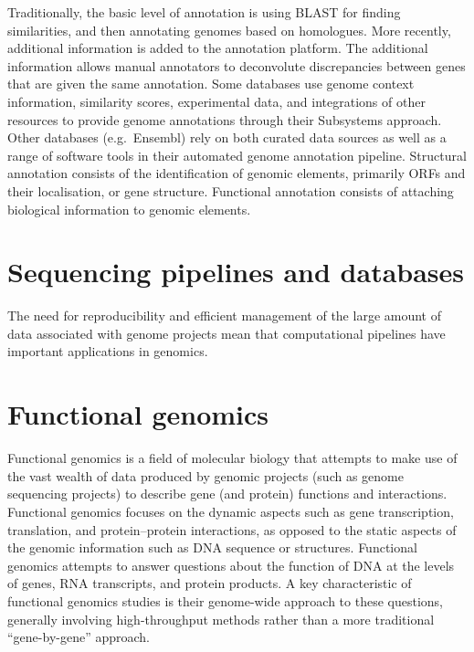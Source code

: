 Traditionally, the basic level of annotation is using BLAST for finding similarities, and then annotating genomes based on homologues. More recently, additional information is added to the annotation platform. The additional information allows manual annotators to deconvolute discrepancies between genes that are given the same annotation. Some databases use genome context information, similarity scores, experimental data, and integrations of other resources to provide genome annotations through their Subsystems approach. Other databases (e.g.~Ensembl) rely on both curated data sources as well as a range of software tools in their automated genome annotation pipeline. Structural annotation consists of the identification of genomic elements, primarily ORFs and their localisation, or gene structure. Functional annotation consists of attaching biological information to genomic elements.

\hypertarget{sequencing-pipelines-and-databases}{%
\section{Sequencing pipelines and databases}\label{sequencing-pipelines-and-databases}}

The need for reproducibility and efficient management of the large amount of data associated with genome projects mean that computational pipelines have important applications in genomics.

\hypertarget{functional-genomics}{%
\section{Functional genomics}\label{functional-genomics}}

Functional genomics is a field of molecular biology that attempts to make use of the vast wealth of data produced by genomic projects (such as genome sequencing projects) to describe gene (and protein) functions and interactions. Functional genomics focuses on the dynamic aspects such as gene transcription, translation, and protein--protein interactions, as opposed to the static aspects of the genomic information such as DNA sequence or structures. Functional genomics attempts to answer questions about the function of DNA at the levels of genes, RNA transcripts, and protein products. A key characteristic of functional genomics studies is their genome-wide approach to these questions, generally involving high-throughput methods rather than a more traditional ``gene-by-gene'' approach.

